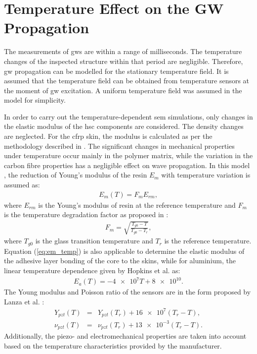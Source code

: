 \section{Temperature Effect on the GW Propagation}
\label{sec:temp}


The measurements of \acp{gw} are within a range of milliseconds.
The temperature changes of the inspected structure within that period are negligible.
Therefore, \ac{gw} propagation can be modelled for the stationary temperature field.
It is assumed that the temperature field can be obtained from temperature sensors at the moment of \ac{gw} excitation.
A uniform temperature field was assumed in the model for simplicity.

In order to carry out the temperature-dependent \ac{sem} simulations, only changes in the elastic modulus of the \ac{hsc} components are considered.
The density changes are neglected. For the \ac{cfrp} skin, the modulus is calculated as per the methodology described in \cite{chamis1983simplified,salamone2009guided}.
The significant changes in mechanical properties under temperature occur mainly in the polymer matrix, while the variation in the carbon fibre properties has a negligible effect on wave propagation.
In this model \cite{salamone2009guided,hopkins2012extreme}, the reduction of Young’s modulus of the resin \(E_m\) with temperature variation is assumed as:
\begin{eqnarray}
	E_m(T)=F_m E_{rm},
	\label{eq:factor_temp}
\end{eqnarray}
where \(E_{rm}\) is the Young’s modulus of resin at the reference temperature and \(F_m\) is the temperature degradation factor as proposed in \cite{chamis1983simplified}:
\begin{eqnarray}
F_m=\sqrt{\frac{T_{g0}-T}{T_{g0}-T_r}},
\label{eq:em_temp}
\end{eqnarray}
where \(T_{g0}\) is the glass transition temperature and \(T_r\) is the reference temperature.
Equation (\ref{eq:em_temp}) is also applicable to determine the elastic modulus of the adhesive layer bonding of the core to the skins, while for aluminium, the linear temperature dependence given by Hopkins et al. \cite{hopkins2012extreme} as:
\begin{eqnarray}
	E_a(T)=-\num{4e7}T+\num{8e10}.
	\label{eq:aluminium_temp}
\end{eqnarray}
The Young modulus and Poisson ratio of the sensors are in the form proposed by Lanza et al. \cite{lanza2008temperature}:
\begin{eqnarray}
	Y_{pzt}(T) & = & Y_{pzt}(T_r) + \num{16e7}(T_r-T),\\
	\nu_{pzt}(T) & = & \nu_{pzt}(T_r) + \num{13e-3}(T_r-T).
	\label{eq:pzt_temp}
\end{eqnarray}
Additionally, the piezo- and electromechanical properties are taken into account based on the temperature characteristics provided by the manufacturer.
